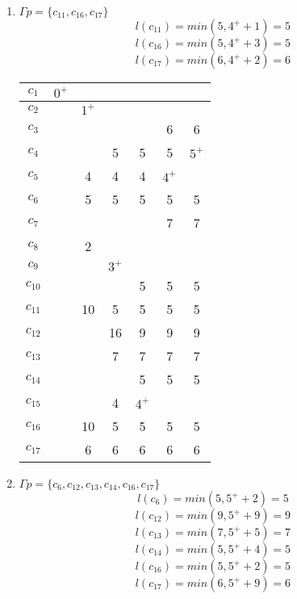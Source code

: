 \documentclass[12pt, a4paper] {ncc}
\begin{document}
\begin{enumerate}
    \item $\Gamma p = \{ c_{11}, c_{16}, c_{17}\}$
        $$l(c_{11}) = min(5, 4^+ + 1) = 5$$
        $$l(c_{16}) = min(5, 4^+ + 3) = 5$$
        $$l(c_{17}) = min(6, 4^+ + 2) = 6$$
\begin{tabular} {|c|c|c|c|c|c|c|}
    \hline
    $c_{1}$  &$0^+$&      &     &     &     &       \\ \hline
    $c_{2}$  & \z  &$1^+$ &     &     &     &       \\ \hline
    $c_{3}$  & \z  & \z   & \z  &\z   & 6   &  6    \\ \hline
    $c_{4}$  & \z  & \z   & 5   & 5   & 5   &$5^+$    \\ \hline
    $c_{5}$  & \z  & 4    & 4   & 4   &$4^+$&          \\ \hline
    $c_{6}$  & \z  & 5    & 5   & 5   & 5   &  5    \\ \hline
    $c_{7}$  & \z  & \z   & \z  & \z  & 7   &  7    \\ \hline
    $c_{8}$  & \z  & 2    & \z  & \z  & \z  &  \z   \\ \hline
    $c_{9}$  & \z  & \z   &$3^+$&     &     &       \\ \hline
    $c_{10}$ & \z  & \z   & \z  & 5   & 5   &  5    \\ \hline
    $c_{11}$ & \z  & 10   &  5  & 5   & 5   &  5    \\ \hline
    $c_{12}$ & \z  & \z   & 16  & 9   & 9   &  9    \\ \hline
    $c_{13}$ & \z  & \z   & 7   & 7   & 7   &  7    \\ \hline
    $c_{14}$ & \z  & \z   & \z  & 5   & 5   &  5    \\ \hline
    $c_{15}$ & \z  & \z   & 4   &$4^+$&     &       \\ \hline
    $c_{16}$ & \z  & 10   & 5   & 5   & 5   &  5    \\ \hline
    $c_{17}$ & \z  & 6    & 6   & 6   & 6   &  6    \\ \hline 
\end{tabular}

    \item $\Gamma p = \{ c_6, c_{12}, c_{13}, c_{14}, c_{16}, c_{17}\}$
        $$l(c_6) = min(5, 5^+ + 2) = 5$$
        $$l(c_{12}) = min(9, 5^+ + 9) = 9$$
        $$l(c_{13}) = min(7, 5^+ + 5) = 7$$
        $$l(c_{14}) = min(5, 5^+ + 4) = 5$$
        $$l(c_{16}) = min(5, 5^+ + 2) = 5$$
        $$l(c_{17}) = min(6, 5^+ + 9) = 6$$


\end{enumerate}
\end{document}
